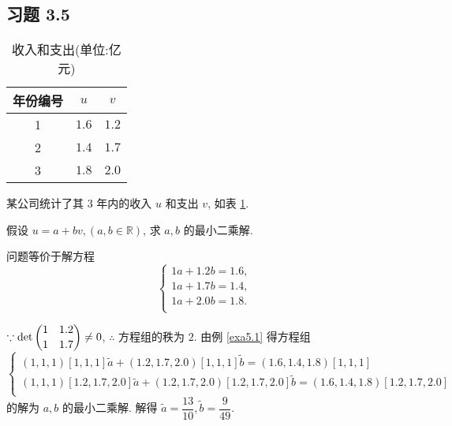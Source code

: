 \documentclass{ctexart}
\begin{document}
\subsection{习题 3.5}
\begin{table}[htbp!]
    \centering
    \begin{tabular}{c|cc}
        年份编号 & $u$ & $v$ \\
        \hline
        1 & $1.6$ & $1.2$ \\
        2 & $1.4$ & $1.7$ \\
        3 & $1.8$ & $2.0$ \\
    \end{tabular}
    \caption{收入和支出(单位:亿元)}\label{tb1}
\end{table}
\begin{exercise}[补充题 5]
    某公司统计了其 3 年内的收入 $u$ 和支出 $v$, 如表 \ref{tb1}.
    
    假设 $u=a+bv,(a,b\in\mathbb{R})$, 求 $a,b$ 的最小二乘解.
\end{exercise}
\begin{solution}
    问题等价于解方程
    \[\begin{cases}
        1a+1.2b=1.6, \\
        1a+1.7b=1.4, \\
        1a+2.0b=1.8. \\
    \end{cases}\]

    $\because\det\dbinom{1\quad1.2}{1\quad1.7}\neq0$, $\therefore$ 方程组的秩为 $2$. 由例 \ref{exa5.1} 得方程组
    \[\begin{cases}
        (1,1,1)[1,1,1]\tilde{a}+(1.2,1.7,2.0)[1,1,1]\tilde{b}=(1.6,1.4,1.8)[1,1,1] \\
        (1,1,1)[1.2,1.7,2.0]\tilde{a}+(1.2,1.7,2.0)[1.2,1.7,2.0]\tilde{b}=(1.6,1.4,1.8)[1.2,1.7,2.0] \\
    \end{cases}\]
    的解为 $a,b$ 的最小二乘解. 解得 $\tilde{a}=\dfrac{13}{10},\tilde{b}=\dfrac{9}{49}$.
\end{solution}
\end{document}
